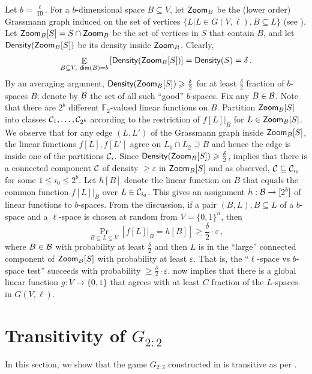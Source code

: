 \documentclass{toc}
\newcommand\Prob[2]{{\Pr_{#1}\left[ {#2} \right]}}
\newcommand\Expect[2]{{\mathop{\mathbb{E}}_{#1}\left[ {#2} \right]}}
\newcommand\eps{\varepsilon}
\newcommand*\dimm{{\sf dim}}
\renewcommand\geq{\geqslant}
\renewcommand\leq{\leqslant}
\begin{document}
Let $b=\frac{\ell}{10}$. For a $b$-dimensional space $B\subseteq V$, let ${\sf Zoom}_B$ be the (lower order) Grassmann graph
induced on the set of vertices $\{L | L \in G(V,\ell), B \subseteq L\}$ (see ).
Let ${\sf Zoom}_B[S] = S \cap {\sf Zoom}_B$
be the set of vertices in $S$ that contain $B$,
and let ${\sf Density} ( {\sf Zoom}_B[S] )$ be its density inside ${\sf Zoom}_B$. Clearly,
 $$ \Expect{B\subseteq V,\ \dimm(B)=b}{ {\sf Density} ( {\sf Zoom}_B[S] )  } =
   {\sf Density} (S) =  \delta\,.$$%
By an averaging argument, ${\sf Density} ( {\sf Zoom}_B[S] ) \geq \frac{\delta}{2}$ for at least $\frac{\delta}{2}$ fraction of $b$-spaces $B$; denote by
${\cal B}$ the set of all such ``good'' $b$-spaces.
Fix any $B \in {\cal B}$. Note that there are $2^b$ different $\mathbb{F}_2$-valued linear functions on $B$. Partition ${\sf Zoom}_B[S]$ into classes ${\cal C}_1,\ldots,
{\cal C}_{2^b}$ according to the restriction of $f[L]|_B$ for $L \in {\sf Zoom}_B[S]$. We observe that for any edge $(L, L')$ of the Grassmann graph inside
${\sf Zoom}_B[S]$, the linear functions $f[L], f[L']$ agree on $L_1 \cap L_2 \supseteq B$ and hence the edge is inside one of the partitions
${\cal C}_i$. Since ${\sf Density} ( {\sf Zoom}_B[S] ) \geq \frac{\delta}{2}$,  implies that there is a connected component ${\cal C}$ of density $\geq \eps$ in  ${\sf Zoom}_B[S]$ and as observed, ${\cal C} \subseteq {\cal C}_{i_0}$ for some $1 \leq i_0 \leq 2^b$. Let $h[B]$ denote the linear function on $B$ that equals the common
function $f[L]|_B$ over $L \in {\cal C}_{i_0}$. This gives an assignment $h: {\cal B} \to [2^b]$ of linear functions to $b$-spaces. From
the discussion, if a pair $(B, L), B \subseteq L$ of a $b$-space and a $\ell$-space is chosen at random from $V = \{0,1\}^n$, then
 $$ \Prob{B \subseteq L \subseteq V}{ f[L]|_B = h[B] } \geq \frac{\delta}{2} \cdot \eps\,,$$%
where $B \in {\cal B}$ with probability at least $\frac{\delta}{2}$ and then $L$ is in the ``large'' connected component of ${\sf Zoom}_B[S]$
 with probability at least $\eps$.
That is, the ``$\ell$-space vs $b$-space test'' succeeds with probability $\geq \frac{\delta}{2} \cdot \eps$.  now implies that there
is a global linear function $g: V \to \{0,1\}$ that agrees with at least $C$ fraction of the $L$-spaces in $G(V,\ell)$.


\section{Transitivity of \texorpdfstring{$G_{2:2}$}{G\_{2:2}}}
\label{appendix:transitive}
In this section,  we show that the game  $G_{2:2}$ constructed in  is transitive as per
.
\end{document}

